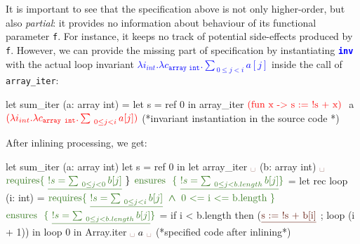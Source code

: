 \documentclass[a4paper,11pt,oneside]{article}
\theoremstyle{plain}
\newcommand{\bwedge}{\boldsymbol{~\wedge~}}
\begin{document}
It is important to see that the specification above is not only higher-order, but also \textit{partial}: it provides no information about behaviour of its functional parameter \texttt{f}. 
	For instance, it keeps no track of potential side-effects produced by \texttt{f}. 
	However, we can provide the missing part of specification by instantiating  \textcolor{blue}{\texttt{\textbf{inv}}} with the actual loop invariant \textcolor{blue}{$\lambda i_{int}.\lambda c_{\texttt{array int}}. \sum_{~0\leq j < i} a[j] $} inside the call of \texttt{array\_iter}:
\begin{small}
\begin{whycode} 
 let sum_iter (a: array int) =		 
   let s = ref 0 in 
   array_iter $\textcolor{red}{\text{(fun x -> s := !s + x)}}~$ a $\textcolor{red}{(\lambda i_{int}.\lambda c_{\texttt{array int}}. \sum_{~0\leq j < i} a[j])}$                    
                                   (*invariant instantiation in the source code *)
\end{whycode}
\end{small}

After inlining processing, we get:

\begin{footnotesize}
\begin{whycode}  
   let sum_iter (a: array int)		
     let s = ref 0 in
     let array_iter $\textcolor{Sepia}{\text{\textvisiblespace}}$ (b: array int) $\textcolor{Sepia}{\text{\textvisiblespace}}$
     $\textcolor{OliveGreen}{\text{requires} \{~\underline{!s = \sum_{~0\leq j < 0} b[j]}}~\}$      
     $\textcolor{OliveGreen}{\text{ensures~~}\{~\underline{!s = \sum_{~0\leq j < b.length} b[j]}\}}$    
     = let rec loop (i: int) = 
         $\textcolor{OliveGreen}{ \text{requires} \{~\underline{!s = \sum_{~0\leq j < i} b[j] } \bwedge \text{0 <= i <= b.length}~\}}$
         $\textcolor{OliveGreen}{\text{ensures~~}\{~\underline{!s = \sum_{~0\leq j < b.length} b[j]}\}}$   
         = if i < b.length then  
         ($\textcolor{Sepia}{\text{\underline{s := !s + b[i]}}}$ ; 
          loop (i + 1)) 
       in loop 0   
     in Array.iter $\textcolor{Sepia}{\text{\textvisiblespace}}~a~\textcolor{Sepia}{\text{\textvisiblespace}}$   
               (*specified code after inlining*)
 	\end{whycode}
 \end{footnotesize}
\end{document}
